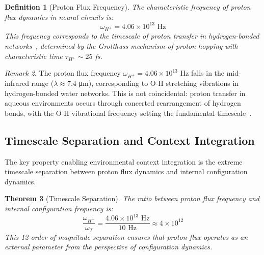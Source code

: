 \documentclass[aps,prd,twocolumn,superscriptaddress,floatfix,nofootinbib]{revtex4-2}
\newtheorem{theorem}{Theorem}[section]
\newtheorem{definition}[theorem]{Definition}
\theoremstyle{remark}
\newtheorem{remark}[theorem]{Remark}
\begin{document}
\begin{definition}[Proton Flux Frequency]
\label{def:hfield}
The characteristic frequency of proton flux dynamics in neural circuits is:
\begin{equation}
\omega_{H^+} = 4.06 \times 10^{13} \text{ Hz}
\end{equation}
This frequency corresponds to the timescale of proton transfer in hydrogen-bonded networks~\cite{mitchell1961coupling,wikstrom2015proton}, determined by the Grotthuss mechanism of proton hopping with characteristic time $\tau_{H^+} \sim 25$ fs.
\end{definition}

\begin{remark}
The proton flux frequency $\omega_{H^+} = 4.06 \times 10^{13}$ Hz falls in the mid-infrared range ($\lambda \approx 7.4$ μm), corresponding to O-H stretching vibrations in hydrogen-bonded water networks. This is not coincidental: proton transfer in aqueous environments occurs through concerted rearrangement of hydrogen bonds, with the O-H vibrational frequency setting the fundamental timescale~\cite{marx2010proton}.
\end{remark}

\subsection{Timescale Separation and Context Integration}

The key property enabling environmental context integration is the extreme timescale separation between proton flux dynamics and internal configuration dynamics.

\begin{theorem}[Timescale Separation]
\label{thm:timescale}
The ratio between proton flux frequency and internal configuration frequency is:
\begin{equation}
\frac{\omega_{H^+}}{\omega_T} = \frac{4.06 \times 10^{13} \text{ Hz}}{10 \text{ Hz}} \approx 4 \times 10^{12}
\end{equation}
This 12-order-of-magnitude separation ensures that proton flux operates as an external parameter from the perspective of configuration dynamics.
\end{theorem}
\end{document}
